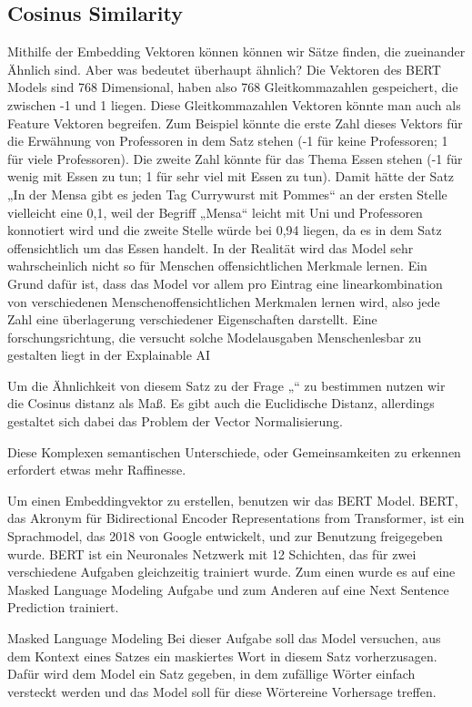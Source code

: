 \subsection{Cosinus Similarity}


Mithilfe der Embedding Vektoren können können wir Sätze finden, die zueinander Ähnlich sind. Aber was bedeutet überhaupt ähnlich? Die Vektoren des BERT Models sind 768 Dimensional, haben also 768 Gleitkommazahlen gespeichert, die zwischen -1 und 1 liegen. Diese Gleitkommazahlen Vektoren könnte man auch als Feature Vektoren begreifen. Zum Beispiel könnte die erste Zahl dieses Vektors für die Erwähnung von Professoren in dem Satz stehen (-1 für keine Professoren; 1 für viele Professoren). Die zweite Zahl könnte für das Thema Essen stehen (-1 für wenig mit Essen zu tun; 1 für sehr viel mit Essen zu tun). Damit hätte der Satz „In der Mensa gibt es jeden Tag Currywurst mit Pommes“ an der ersten Stelle vielleicht eine 0,1, weil der Begriff „Mensa“ leicht mit Uni und Professoren konnotiert wird und die zweite Stelle würde bei 0,94 liegen, da es in dem Satz offensichtlich um das Essen handelt. 
In der Realität wird das Model sehr wahrscheinlich nicht so für Menschen offensichtlichen Merkmale lernen. Ein Grund dafür ist, dass das Model vor allem pro Eintrag eine linearkombination von verschiedenen Menschenoffensichtlichen Merkmalen lernen wird, also jede Zahl eine überlagerung verschiedener Eigenschaften darstellt. 
Eine forschungsrichtung, die versucht solche Modelausgaben Menschenlesbar zu gestalten liegt in der Explainable AI

Um die Ähnlichkeit von diesem Satz zu der Frage „“ zu bestimmen nutzen wir die Cosinus distanz als Maß. Es gibt auch die Euclidische Distanz, allerdings gestaltet sich dabei das Problem der Vector Normalisierung.




Diese Komplexen semantischen Unterschiede, oder Gemeinsamkeiten zu erkennen erfordert etwas mehr Raffinesse. 

Um einen Embeddingvektor zu erstellen, benutzen wir das BERT Model. BERT, das Akronym für Bidirectional Encoder Representations from Transformer, ist ein Sprachmodel, das 2018 von Google entwickelt, und zur Benutzung freigegeben wurde. BERT ist ein Neuronales Netzwerk mit 12 Schichten, das für zwei verschiedene Aufgaben gleichzeitig trainiert wurde. Zum einen wurde es auf eine Masked Language Modeling Aufgabe und zum Anderen auf eine Next Sentence Prediction trainiert. 

Masked Language Modeling
Bei dieser Aufgabe soll das Model versuchen, aus dem Kontext eines Satzes ein maskiertes Wort in diesem Satz vorherzusagen. Dafür wird dem Model ein Satz gegeben, in dem zufällige Wörter einfach versteckt werden und das Model soll für diese Wörtereine Vorhersage treffen. 

